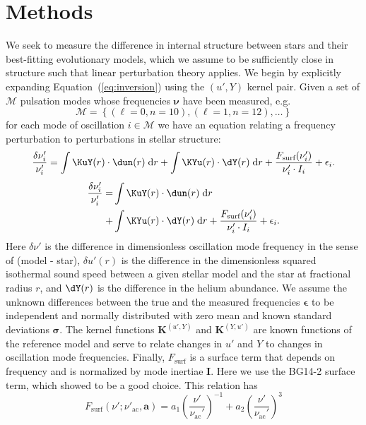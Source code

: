 \section{Methods}
We seek to measure the difference in internal structure between stars and their best-fitting evolutionary models, which we assume to be sufficiently close in structure such that linear perturbation theory applies. 
We begin by explicitly expanding Equation~(\ref{eq:inversion}) using the ${(u', Y)}$ kernel pair. 
Given a set of $\mathscr{M}$ pulsation modes whose frequencies $\boldsymbol\nu$ have been measured, e.g.\ $$\mathscr{M}=\left\{(\ell=0, n=10), (\ell=1, n=12), \ldots\right\}$$ for each mode of oscillation ${i\in\mathscr{M}}$ we have an equation relating a frequency perturbation to perturbations in stellar structure: 
\ifhbonecolumn
\begin{equation} \label{eq:forward2} 
         \frac{\delta\nu_i'}{\nu_i'} 
         = 
          \int \KuY(r) \cdot \dun(r) \; \text{d}r 
         +\int \KYu(r) \cdot \dY(r)  \; \text{d}r 
         +\frac{F_{\text{surf}}(\nu_i')}{\nu_i'\cdot I_i} 
         +\epsilon_i. 
\end{equation} 
\else
\begin{align} \label{eq:forward2} 
         \frac{\delta\nu_i'}{\nu_i'} 
         = 
         &\int \KuY(r) \cdot \dun(r) \; \text{d}r 
\notag\\+&\int \KYu(r) \cdot \dY(r)  \; \text{d}r 
         +\frac{F_{\text{surf}}(\nu_i')}{\nu_i'\cdot I_i} 
         +\epsilon_i. 
\end{align} 
\fi
Here $\delta \nu'$ is the difference in dimensionless oscillation mode frequency in the sense of (model - star), 
$\delta u'(r)$ is the difference in the dimensionless squared isothermal sound speed between a given stellar model and the star at fractional radius $r$, 
and $\dY(r)$ is the difference in the helium abundance. 
We assume the unknown differences between the true and the measured frequencies $\boldsymbol\epsilon$ to be independent and normally distributed with zero mean and known standard deviations $\boldsymbol{\sigma}$. 
The kernel functions $\boldsymbol{K}^{(u', Y)}$ and $\boldsymbol{K}^{(Y, u')}$ are known functions of the reference model and serve to relate changes in $u'$ and $Y$ to changes in oscillation mode frequencies. 
Finally, $F_{\text{surf}}$ is a surface term that depends on frequency and is normalized by mode inertiae $\boldsymbol{I}$. Here we use the BG14-2 surface term, which \citet{2015ApJ...808..123S} showed to be a good choice. This relation has 
\begin{equation}
    F_{\text{surf}}(\nu'; \nu'_{\text{ac}}, \mathbf a) = 
           a_1 \left( \frac{\nu'}{\nu_{\text{ac}}'} \right)^{-1} 
         + a_2 \left( \frac{\nu'}{\nu_{\text{ac}}'} \right)^3 
\end{equation}
